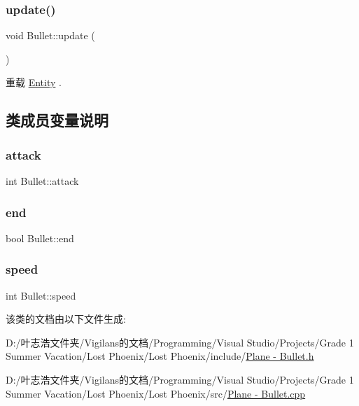 \mbox{\label{class_bullet_a32f4a0611fe2dd245fee955d14ca1f68}} 
\subsubsection{\texorpdfstring{update()}{update()}}
{\footnotesize\ttfamily void Bullet\+::update (\begin{DoxyParamCaption}{ }\end{DoxyParamCaption})\hspace{0.3cm}{\ttfamily [virtual]}}



重载 \hyperlink{class_entity_a00b6eeaf99b35c8f8b10b5fbfc1baf4f}{Entity} .



\subsection{类成员变量说明}
\mbox{\label{class_bullet_ab9e1e40341cddf25f8acc4e378b26f4a}} 
\subsubsection{\texorpdfstring{attack}{attack}}
{\footnotesize\ttfamily int Bullet\+::attack}

\mbox{\label{class_bullet_aff37198e603e1a2b8ff28e0df6e156a4}} 
\subsubsection{\texorpdfstring{end}{end}}
{\footnotesize\ttfamily bool Bullet\+::end}

\mbox{\label{class_bullet_a110bd4348fc7547125b4ec4bbf94d5f5}} 
\subsubsection{\texorpdfstring{speed}{speed}}
{\footnotesize\ttfamily int Bullet\+::speed}



该类的文档由以下文件生成\+:\begin{DoxyCompactItemize}
\item 
D\+:/叶志浩文件夹/\+Vigilans的文档/\+Programming/\+Visual Studio/\+Projects/\+Grade 1 Summer Vacation/\+Lost Phoenix/\+Lost Phoenix/include/\hyperlink{_plane_01-_01_bullet_8h}{Plane -\/ Bullet.\+h}\item 
D\+:/叶志浩文件夹/\+Vigilans的文档/\+Programming/\+Visual Studio/\+Projects/\+Grade 1 Summer Vacation/\+Lost Phoenix/\+Lost Phoenix/src/\hyperlink{_plane_01-_01_bullet_8cpp}{Plane -\/ Bullet.\+cpp}\end{DoxyCompactItemize}
